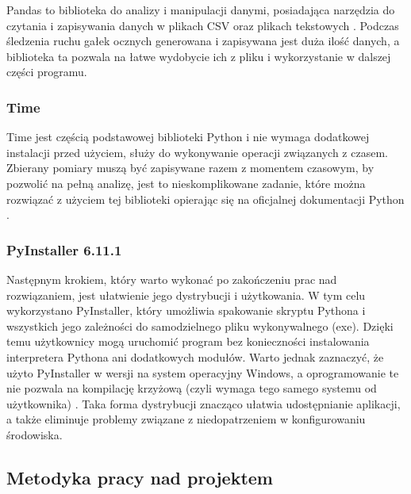 \documentclass[a4paper,twoside,12pt]{book}
\begin{document}
Pandas to biblioteka do analizy i manipulacji danymi, posiadająca narzędzia do czytania i zapisywania danych w plikach CSV oraz plikach tekstowych \cite{bib:Pandas-about}. Podczas śledzenia ruchu gałek ocznych generowana i zapisywana jest duża ilość danych, a biblioteka ta pozwala na łatwe wydobycie ich z pliku i wykorzystanie w dalszej części programu.

\subsubsection{Time}

Time jest częścią podstawowej biblioteki Python i nie wymaga dodatkowej instalacji przed użyciem, służy do wykonywanie operacji związanych z czasem. Zbierany pomiary muszą być zapisywane razem z momentem czasowym, by pozwolić na pełną analizę, jest to nieskomplikowane zadanie, które można rozwiązać z użyciem tej biblioteki opierając się na oficjalnej dokumentacji Python \cite{bib:time-Python}.

\subsubsection{PyInstaller 6.11.1}

Następnym krokiem, który warto wykonać po zakończeniu prac nad rozwiązaniem, jest ułatwienie jego dystrybucji i użytkowania. W tym celu wykorzystano PyInstaller, który umożliwia spakowanie skryptu Pythona i wszystkich jego zależności do samodzielnego pliku wykonywalnego (exe). Dzięki temu użytkownicy mogą uruchomić program bez konieczności instalowania interpretera Pythona ani dodatkowych modułów. Warto jednak zaznaczyć, że użyto PyInstaller w wersji na system operacyjny Windows, a oprogramowanie te nie pozwala na kompilację krzyżową (czyli wymaga tego samego systemu od użytkownika) \cite{bib:PyInstaller-manual}. Taka forma dystrybucji znacząco ułatwia udostępnianie aplikacji, a także eliminuje problemy związane z niedopatrzeniem w konfigurowaniu środowiska.

\subsection{Metodyka pracy nad projektem}
\label{subsec:Metodyka-pracy-nad-projektem}
\end{document}
